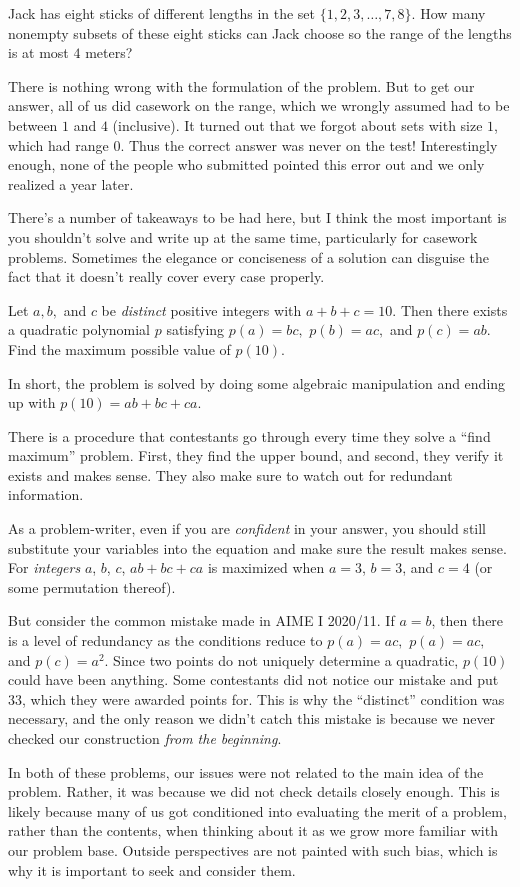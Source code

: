 \documentclass[points=false]{bounce}
\begin{document}
\begin{exam}[JMC 2020/11]
    Jack has eight sticks of different lengths in the set $\{1,2,3,\dots,7,8\}$. How many nonempty subsets of these eight sticks can Jack choose so the range of the lengths is at most $4$ meters?
\end{exam}

There is nothing wrong with the formulation of the problem. But to get our answer, all of us did casework on the range, which we wrongly assumed had to be between $1$ and $4$ (inclusive). It turned out that we forgot about sets with size $1$, which had range $0$. Thus the correct answer was never on the test! Interestingly enough, none of the people who submitted pointed this error out and we only realized a year later.

There's a number of takeaways to be had here, but I think the most important is you shouldn't solve and write up at the same time, particularly for casework problems. Sometimes the elegance or conciseness of a solution can disguise the fact that it doesn't really cover every case properly.

\begin{exam}[MAT 2021/5]
    Let $a, b,$ and $c$ be \emph{distinct} positive integers with $a + b + c = 10.$ Then there exists a quadratic polynomial $p$ satisfying $p(a) = bc,$ $p(b) = ac,$ and $p(c) = ab.$ Find the maximum possible value of $p(10).$
\end{exam}

In short, the problem is solved by doing some algebraic manipulation and ending up with $p(10)=ab+bc+ca$.

There is a procedure that contestants go through every time they solve a ``find maximum'' problem. First, they find the upper bound, and second, they verify it exists and makes sense. They also make sure to watch out for redundant information.

As a problem-writer, even if you are \emph{confident} in your answer, you should still substitute your variables into the equation and make sure the result makes sense. For \emph{integers} $a$, $b$, $c$, $ab+bc+ca$ is maximized when $a=3$, $b=3$, and $c=4$ (or some permutation thereof).

But consider the common mistake made in AIME I 2020/11. If $a=b$, then there is a level of redundancy as the conditions reduce to $p(a)=ac,$ $p(a)=ac,$ and $p(c)=a^2$. Since two points do not uniquely determine a quadratic, $p(10)$ could have been anything. Some contestants did not notice our mistake and put $33$, which they were awarded points for. This is why the ``distinct'' condition was necessary, and the only reason we didn't catch this mistake is because we never checked our construction \emph{from the beginning}.

In both of these problems, our issues were not related to the main idea of the problem. Rather, it was because we did not check details closely enough. This is likely because many of us got conditioned into evaluating the merit of a problem, rather than the contents, when thinking about it as we grow more familiar with our problem base. Outside perspectives are not painted with such bias, which is why it is important to seek and consider them.
\end{document}
